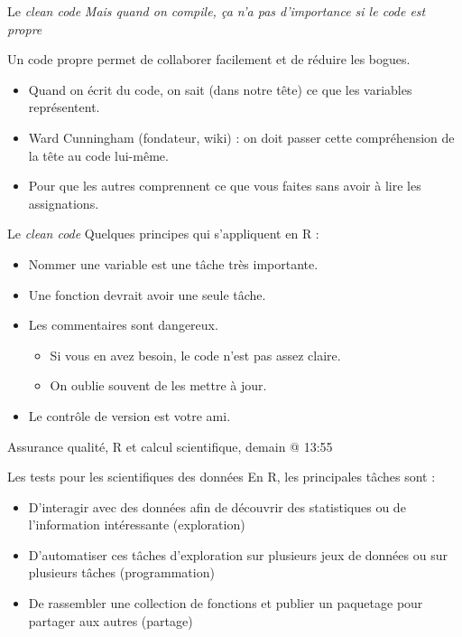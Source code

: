 \documentclass[11pt]{beamer}
\begin{document}
\begin{frame}{Le \textit{clean code}}
\textit{Mais quand on compile, ça n'a pas d'importance si le code est propre}

Un code propre permet de collaborer facilement et de réduire les bogues.
\begin{itemize}
    \item Quand on écrit du code, on sait (dans notre tête) ce que les variables représentent.
    \item Ward Cunningham (fondateur, wiki) : on doit passer cette compréhension de la tête au code lui-même.
    \item Pour que les autres comprennent ce que vous faites sans avoir à lire les assignations.
\end{itemize}
\end{frame}

\begin{frame}{Le \textit{clean code}}
Quelques principes qui s'appliquent en \textsf{R} :
\begin{itemize}
\item Nommer une variable est une tâche très importante.
\item Une fonction devrait avoir une seule tâche.
\item Les commentaires sont dangereux.
\begin{itemize}
\item Si vous en avez besoin, le code n'est pas assez claire.
\item On oublie souvent de les mettre à jour.
\end{itemize}
\item Le contrôle de version est votre ami.
\end{itemize}
Assurance qualité, R et calcul scientifique, demain @ 13:55
\end{frame}

\begin{frame}{Les tests pour les scientifiques des données}
En \textsf{R}, les principales tâches sont :
\begin{itemize}
\item D'interagir avec des données afin de découvrir des statistiques ou de l'information intéressante (exploration)
\item D'automatiser ces tâches d'exploration sur plusieurs jeux de données ou sur plusieurs tâches (programmation)
\item De rassembler une collection de fonctions et publier un paquetage pour partager aux autres (partage)
\end{itemize}
\end{frame}
\end{document}
